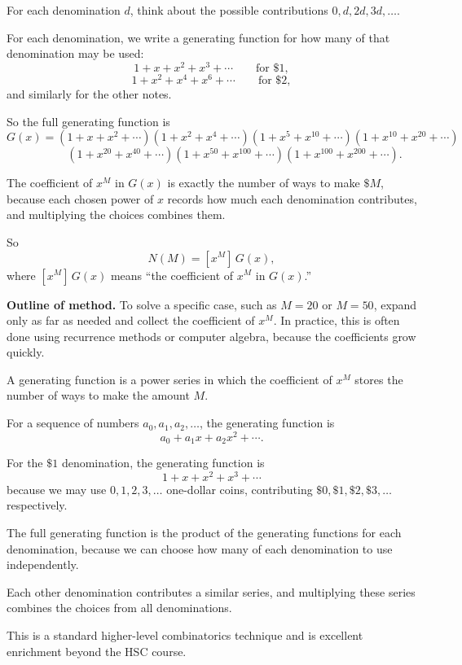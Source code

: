 \begin{hint}
For each denomination $d$, think about the possible contributions $0,d,2d,3d,\dots$.
\end{hint}

\begin{solution}
For each denomination, we write a generating function for how many of that denomination may be used:
\[
1+x+x^2+x^3+\cdots \qquad \text{for } \$1,
\]
\[
1+x^2+x^4+x^6+\cdots \qquad \text{for } \$2,
\]
and similarly for the other notes.

So the full generating function is
\[
G(x)=
(1+x+x^2+\cdots)
(1+x^2+x^4+\cdots)
(1+x^5+x^{10}+\cdots)
(1+x^{10}+x^{20}+\cdots)
\]
\[
\qquad\qquad
(1+x^{20}+x^{40}+\cdots)
(1+x^{50}+x^{100}+\cdots)
(1+x^{100}+x^{200}+\cdots).
\]

The coefficient of $x^M$ in $G(x)$ is exactly the number of ways to make $\$M$, because each chosen power of $x$ records how much each denomination contributes, and multiplying the choices combines them.

So
\[
N(M)=[x^M]\,G(x),
\]
where $[x^M]\,G(x)$ means ``the coefficient of $x^M$ in $G(x)$.'' 

\textbf{Outline of method.} To solve a specific case, such as $M=20$ or $M=50$, expand only as far as needed and collect the coefficient of $x^M$. In practice, this is often done using recurrence methods or computer algebra, because the coefficients grow quickly.
\end{solution}

\begin{takeaways}
\item A generating function is a power series in which the coefficient of $x^M$ stores the number of ways to make the amount $M$.
\item For a sequence of numbers $a_0,a_1,a_2,\dots$, the generating function is
\[a_0+a_1x+a_2x^2+\cdots.
\]
\item For the $\$1$ denomination, the generating function is
\[
1+x+x^2+x^3+\cdots
\]
because we may use $0,1,2,3,\dots$ one-dollar coins, contributing $\$0,\$1,\$2,\$3,\dots$ respectively.

\item The full generating function is the product of the generating functions for each denomination, because we can choose how many of each denomination to use independently.
\item Each other denomination contributes a similar series, and multiplying these series combines the choices from all denominations.
\item This is a standard higher-level combinatorics technique and is excellent enrichment beyond the HSC course.
\end{takeaways}

